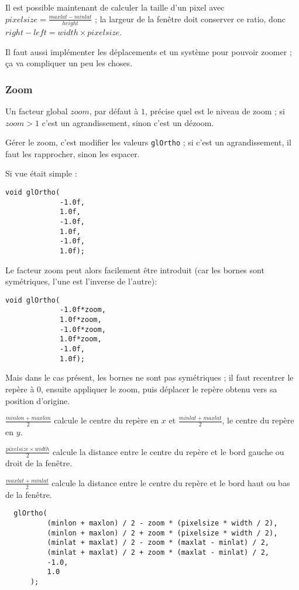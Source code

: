 Il est possible maintenant de calculer la taille d'un pixel avec $pixelsize=\frac{maxlat-minlat}{height}$ ;
la largeur de la fenêtre doit conserver ce ratio, donc $right-left = width \times pixelsize$.

Il faut aussi implémenter les déplacements et un système pour pouvoir zoomer ; ça va compliquer un peu les choses.

\subsubsection{Zoom}

Un facteur global $zoom$, par défaut à $1$, précise quel est le niveau de zoom ; si $zoom > 1$ c'est un agrandissement,
sinon c'est un dézoom.

Gérer le zoom, c'est modifier les valeurs \texttt{glOrtho} ; si c'est un agrandissement, il faut les rapprocher, sinon
les espacer.

\vspace{5mm}

Si vue était simple :
\begin{lstlisting}
void glOrtho(
             -1.0f,
             1.0f,
             -1.0f,
             1.0f,
             -1.0f,
             1.0f);
\end{lstlisting}

Le facteur zoom peut alors facilement être introduit (car les bornes sont symétriques, l'une est l'inverse de l'autre):

\begin{lstlisting}
void glOrtho(
             -1.0f*zoom,
             1.0f*zoom,
             -1.0f*zoom,
             1.0f*zoom,
             -1.0f,
             1.0f);
\end{lstlisting}

Mais dans le cas présent, les bornes ne sont pas symétriques ; il faut recentrer le repère à 0, ensuite appliquer le zoom,
puis déplacer le repère obtenu vers sa position d'origine.

$\frac{minlon + maxlon}{2}$ calcule le centre du repère en $x$ et $\frac{minlat + maxlat}{2}$, le centre du repère en $y$.

$\frac{pixelsize \times width}{2}$ calcule la distance entre le centre du repère et le bord gauche ou droit de la fenêtre.

$\frac{maxlat + minlat}{2}$ calcule la distance entre le centre du repère et le bord haut ou bas de la fenêtre.

\begin{lstlisting}
  glOrtho(
          (minlon + maxlon) / 2 - zoom * (pixelsize * width / 2),
          (minlon + maxlon) / 2 + zoom * (pixelsize * width / 2),
          (minlat + maxlat) / 2 - zoom * (maxlat - minlat) / 2,
          (minlat + maxlat) / 2 + zoom * (maxlat - minlat) / 2,
          -1.0,
          1.0
      );
\end{lstlisting}


